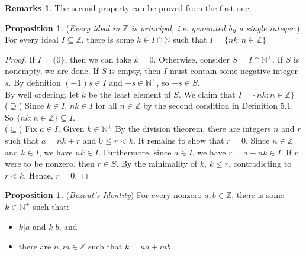 \documentclass[14pt]{article}
\theoremstyle{definition}
\newtheorem*{remark}{Remarks}
\newtheorem{proposition}[definition]{Proposition}
\begin{document}
\begin{remark}
    The second property can be proved from the first one.
\end{remark}

\vspace{2mm} %

\begin{proposition}
    (\textit{Every ideal in $\mathbb{Z}$ is principal, i.e. generated by a single integer.})\\
    For every ideal $I\subseteq\mathbb{Z} $, there is some $k\in I\cap \mathbb{N}$ such that $I=\{nk:n\in \mathbb{Z}\}$
    
\end{proposition}

\begin{proof}
    If $I=\{0\}$, then we can take $k=0$. Otherwise, consider $S=I\cap \mathbb{N}^+$.
    If $S$ is nonempty, we are done. If $S$ is empty, then $I$ must contain some negative integer $s$. By definition $(-1)s\in I$ and $-s\in \mathbb{N}^+$, so $-s\in S$.\\
    By well ordering, let $k $ be the least element of $S$. We claim that $I=\{nk\colon n\in \mathbb{Z}\}$\\
    ($\supseteq$) Since $ k\in I$, $nk\in I$ for all $n\in\mathbb{Z} $ by the second condition in Definition 5.1.  So $\{nk\colon n\in \mathbb{Z}\}\subseteq I$. \\
    ($\subseteq$) Fix $a\in I$. Given $k\in\mathbb{N}^+ $ By the division theorem, there are integers $n$ and $r$ such that $a=nk+r$ and $0\leq r< k $. It remains to show that $r=0$. Since $n\in\mathbb{Z} $ and $k\in I$, we have $nk\in I$. Furthermore, since $a\in I$, we have $r=a-nk \in I$. If $r $ were to be nonzero, then $r\in S$. By the minimality of $k$, $k\leq r$, contradicting to $r<k$. Hence, $r=0$.
\end{proof}

\vspace{2mm} %

\begin{proposition}
    (\textit{Bezout's Identity}) For every nonzero $a,b\in \mathbb{Z}$, there is some $ k\in\mathbb{N}^+ $ such that:
    \begin{itemize}
        \item $k|a$ and $k|b$, and 
        \item there are $n,m \in\mathbb{Z}$ such that $k=na+mb$.
    \end{itemize}
\end{proposition}
\end{document}
